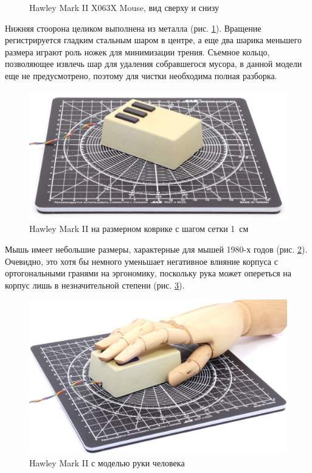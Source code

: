 \documentclass[11pt, a4paper]{article}
\begin{document}
\begin{figure}[h]
    \caption{Hawley Mark II X063X Mouse, вид сверху и снизу}
    \label{fig:HawleyMarkIITopAndBottom}
\end{figure}



Нижняя стоорона целиком выполнена из металла (рис. \ref{fig:HawleyMarkIITopAndBottom}). Вращение регистрируется гладким стальным шаром в центре, а еще два шарика меньшего размера играют роль ножек для минимизации трения. Съемное кольцо, позволяющее извлечь шар для удаления собравшегося мусора, в данной модели еще не предусмотрено, поэтому для чистки необходима полная разборка.

\begin{figure}[h]
    \centering
    \includegraphics[scale=0.5]{1982_hawley_mark_ii/size_30.jpg}
    \caption{Hawley Mark II на размерном коврике с шагом сетки 1~см}
    \label{fig:HawleyMarkIISize}
\end{figure}

Мышь имеет небольшие размеры, характерные для мышей 1980-х годов (рис. \ref{fig:HawleyMarkIISize}). Очевидно, это хотя бы немного уменьшает негативное влияние корпуса с ортогональными гранями на эргономику, поскольку рука может опереться на корпус лишь в незначительной степени (рис. \ref{fig:HawleyMarkIIHand}).

\begin{figure}[h]
    \centering
    \includegraphics[scale=0.5]{1982_hawley_mark_ii/hand_60.jpg}
    \caption{Hawley Mark II с моделью руки человека}
    \label{fig:HawleyMarkIIHand}
\end{figure}
\end{document}
